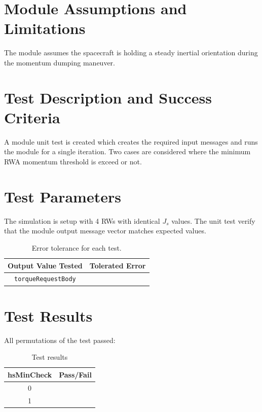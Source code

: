 \documentclass[]{BasiliskReportMemo}
\begin{document}
\section{Module Assumptions and Limitations}
The module assumes the spacecraft is holding a steady inertial orientation during the momentum dumping maneuver.  










\section{Test Description and Success Criteria}
A module unit test is created which creates the required input messages and runs the module for a single iteration.  Two cases are considered where the minimum RWA momentum threshold is exceed or not.




\section{Test Parameters}
The simulation is setup with 4  RWs with identical $J_{s}$ values.  
The unit test verify that the module output  message vector matches expected values.
\begin{table}[htbp]
	\caption{Error tolerance for each test.}
	\label{tab:errortol}
	\centering \fontsize{10}{10}\selectfont
	\begin{tabular}{ c | c } %
		\hline\hline
		\textbf{Output Value Tested}  & \textbf{Tolerated Error}  \\ 
		\hline
		{\tt torqueRequestBody}        & 	   \\ 
		\hline\hline
	\end{tabular}
\end{table}




\section{Test Results}
All permutations of the test passed:
\begin{table}[h]
	\caption{Test results}
	\label{tab:results}
	\centering \fontsize{10}{10}\selectfont
	\begin{tabular}{c | c  } %
		\hline\hline
		\textbf{hsMinCheck} 	&\textbf{Pass/Fail} \\ 
		\hline
	   0	   			&  \\ 
	   1 	   			&  \\ 
	   \hline\hline
	\end{tabular}
\end{table}
\end{document}
